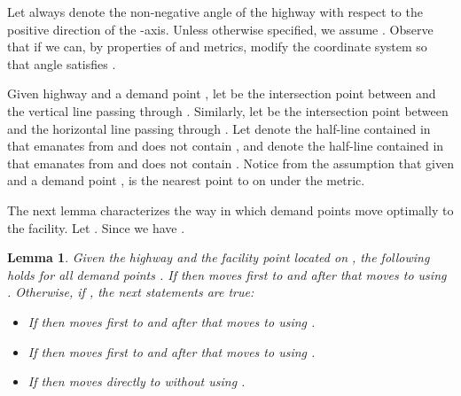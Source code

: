 \documentclass[11pt,a4paper,oneside,onecolumn]{article}
\newtheorem{lemma}[theorem]{Lemma}
\begin{document}
Let  always denote the non-negative angle of the highway
with respect to the positive direction of the -axis. Unless
otherwise specified, we assume .
Observe that if  we can, by properties of
 and  metrics, modify the coordinate system so that angle
 satisfies .

Given highway  and a demand point , let  be the
intersection point between  and the vertical line passing through
. Similarly, let  be the intersection point between  and
the horizontal line passing through . Let  denote the
half-line contained in  that emanates from  and does not
contain , and  denote the half-line contained in 
that emanates from  and does not contain . Notice from the
assumption  that given  and a
demand point ,  is the nearest point to  on  under the
 metric.

The next lemma characterizes the way in which demand points move
optimally to the facility.
Let . Since 
we have .

\begin{lemma}\label{lemma:way-of-move}
Given the highway  and the facility point  located on , the
following holds for all demand points .
If  then  moves first to  and after
that moves to  using .
Otherwise, if , the next
statements are true:
\begin{itemize}
  \item[a] If  then  moves first to  and after that
moves to  using .
  \item[b] If  then  moves first to  and after that
moves to  using .
  \item[c] If  then  moves
directly to  without using .
\end{itemize}
\end{lemma}
\end{document}
